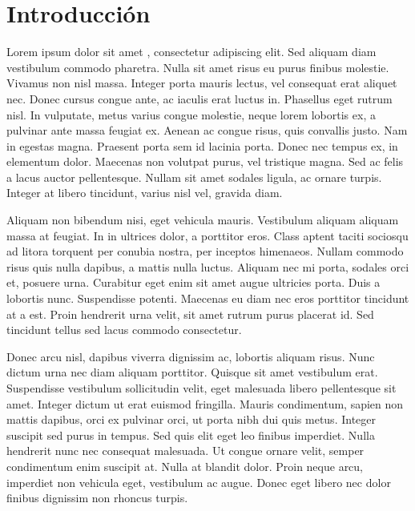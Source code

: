 






\chapter{Introducción}

Lorem ipsum dolor sit amet \cite{robomind-web}, consectetur adipiscing elit. Sed aliquam diam vestibulum commodo pharetra. Nulla sit amet risus eu purus finibus molestie. Vivamus non nisl massa. Integer porta mauris lectus, vel consequat erat aliquet nec. Donec cursus congue ante, ac iaculis erat luctus in. Phasellus eget rutrum nisl. In vulputate, metus varius congue molestie, neque lorem lobortis ex, a pulvinar ante massa feugiat ex. Aenean ac congue risus, quis convallis justo. Nam in egestas magna. Praesent porta sem id lacinia porta. Donec nec tempus ex, in elementum dolor. Maecenas non volutpat purus, vel tristique magna. Sed ac felis a lacus auctor pellentesque. Nullam sit amet sodales ligula, ac ornare turpis. Integer at libero tincidunt, varius nisl vel, gravida diam.

Aliquam non bibendum nisi, eget vehicula mauris. Vestibulum aliquam aliquam massa at feugiat. In in ultrices dolor, a porttitor eros. Class aptent taciti sociosqu ad litora torquent per conubia nostra, per inceptos himenaeos. Nullam commodo risus quis nulla dapibus, a mattis nulla luctus. Aliquam nec mi porta, sodales orci et, posuere urna. Curabitur eget enim sit amet augue ultricies porta. Duis a lobortis nunc. Suspendisse potenti. Maecenas eu diam nec eros porttitor tincidunt at a est. Proin hendrerit urna velit, sit amet rutrum purus placerat id. Sed tincidunt tellus sed lacus commodo consectetur.

Donec arcu nisl, dapibus viverra dignissim ac, lobortis aliquam risus. Nunc dictum urna nec diam aliquam porttitor. Quisque sit amet vestibulum erat. Suspendisse vestibulum sollicitudin velit, eget malesuada libero pellentesque sit amet. Integer dictum ut erat euismod fringilla. Mauris condimentum, sapien non mattis dapibus, orci ex pulvinar orci, ut porta nibh dui quis metus. Integer suscipit sed purus in tempus. Sed quis elit eget leo finibus imperdiet. Nulla hendrerit nunc nec consequat malesuada. Ut congue ornare velit, semper condimentum enim suscipit at. Nulla at blandit dolor. Proin neque arcu, imperdiet non vehicula eget, vestibulum ac augue. Donec eget libero nec dolor finibus dignissim non rhoncus turpis.

